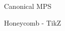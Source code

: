 \begin{frame}{Canonical MPS}
\begin{figure}
    \scalebox{.5}{} 
\end{figure}
\end{frame}



\begin{frame}{Honeycomb - TikZ}

\end{frame}



